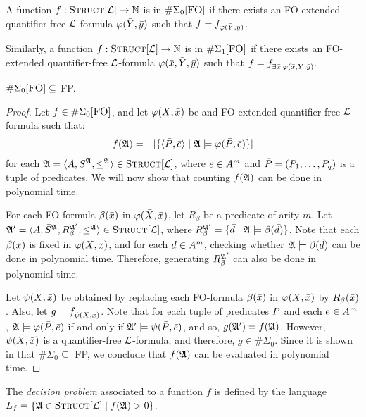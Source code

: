 A function $f:\Truc \to \N$ is in $\Eo$ if there exists an {\sc FO}-extended quantifier-free $\L$-formula $\varphi(\Y,\y)$ such that $f = f_{\varphi(\Y,\y)}$.

Similarly, a function $f:\Truc \to \N$ is in $\E1$ if there exists an {\sc FO}-extended quantifier-free $\L$-formula $\varphi(\x,\Y,\y)$ such that $f = f_{\exists \x \: \varphi(\x,\Y,\y)}.$\\

\begin{theo} \label{fp1}
	$\Eo \subseteq$ {\sc FP}.
\end{theo}
\begin{proof}
	Let $f \in \Eo$, and let $\varphi(\X,\x)$ be and {\sc FO}-extended quantifier-free $\L$-formula such that:
	\begin{eqnarray*}
		f(\A) &=& \vert \{\langle \P,\e  \rangle \mid \A \models \varphi(\P,\e) \} \vert
	\end{eqnarray*}
	for each $\A = \langle A, \S^{\A}, \leq^{\A} \rangle \in \Truc$, where $\e \in A^m$ and $\P = (P_1,\ldots,P_q)$ is a tuple of predicates. We will now show that counting $f(\A)$ can be done in polynomial time.
	
	For each {\sc FO}-formula $\beta(\x)$ in $\varphi(\X,\x)$, let $R_{\beta}$ be a predicate of arity $m$. Let $\A^\prime = \langle A, \S^{\A}, R_{\beta}^{\A^\prime}, \leq^{\A} \rangle \in \Truc$, where $R_{\beta}^{\A^\prime} = \{\d \mid \A \models \beta(\d)\}$. Note that each $\beta(\x)$ is fixed in $\varphi(\X,\x)$, and for each $\d \in A^m$, checking whether $\A \models \beta(\d)$ can be done in polynomial time. Therefore, generating $R_{\beta}^{\A^\prime}$ can also be done in polynomial time.
	
	Let $\psi(\X,\x)$ be obtained by replacing each {\sc FO}-formula $\beta(\x)$ in $\varphi(\X,\x)$ by $R_{\beta}(\x)$. Also, let $g = f_{\psi(\X,\x)}$. Note that for each tuple of predicates $\P$ and each $\e \in A^m$, $\A \models \varphi(\P,\e)$ if and only if $\A^\prime \models \psi(\P,\e)$, and so, $g(\A^\prime) = f(\A)$. However, $\psi(\X,\x)$ is a quantifier-free $\L$-formula, and therefore, $g \in \#\Sigma_0$. Since it is shown in \cite{DBLP:journals/jcss/SalujaST95} that $\#\Sigma_0 \subseteq$ {\sc FP}, we conclude that $f(\A)$ can be evaluated in polynomial time.
	
\end{proof}

The {\em decision problem} associated to a function $f$ is defined by the language $L_f = \{\A \in \Truc \mid f(\A) > 0\}$.

